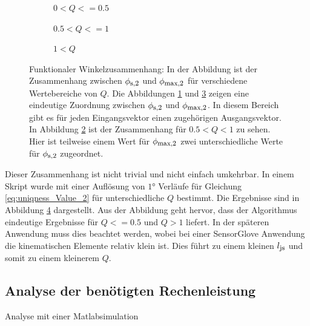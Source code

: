 	
\begin{figure}
	\begin{subfigure}{0.5\textwidth}
		\centering
		\caption{$0<Q<=0.5$}
		\label{fig:0_05_Unique}
	\end{subfigure}
	\hspace{0.25cm}
	\begin{subfigure}{0.5\textwidth}
		\centering
		\caption{$0.5<Q<=1$}
		\label{fig:05_10_unique}
	\end{subfigure}
	\begin{subfigure}{0.5\textwidth}
		\centering
		\caption{$1<Q$}
		\label{fig:bigger1_unique}
	\end{subfigure}
	\caption{ Funktionaler Winkelzusammenhang: In der Abbildung ist der Zusammenhang zwischen $\phi_{\textrm{\footnotesize{s,2}}}$ und $\phi_{\textrm{\footnotesize{max,2}}}$ für verschiedene Wertebereiche von $Q$. Die Abbildungen \ref{fig:0_05_Unique} und \ref{fig:bigger1_unique} zeigen eine eindeutige Zuordnung zwischen $\phi_{\textrm{\footnotesize{s,2}}}$ und $\phi_{\textrm{\footnotesize{max,2}}}$. In diesem Bereich gibt es für jeden Eingangsvektor einen zugehörigen Ausgangsvektor. In Abbildung \ref{fig:05_10_unique} ist der Zusammenhang für $0.5 < Q < 1$ zu sehen. Hier ist teilweise einem Wert für $\phi_{\textrm{\footnotesize{max,2}}}$ zwei unterschiedliche Werte für $\phi_{\textrm{\footnotesize{s,2}}}$ zugeordnet.}

    
	\label{fig:uniqueness}
\end{figure}

Dieser Zusammenhang ist nicht trivial und nicht einfach umkehrbar. In einem Skript wurde mit einer Auflösung von $1°$ Verläufe für Gleichung \ref{eq:uniqness_Value_2} für unterschiedliche $Q$ bestimmt. Die Ergebnisse sind in Abbildung \ref{fig:uniqueness} dargestellt. Aus der Abbildung geht hervor, dass der Algorithmus eindeutige Ergebnisse für $Q<=0.5$ und $Q>1$ liefert. In der späteren Anwendung muss dies beachtet werden, wobei bei einer SensorGlove Anwendung die kinematischen Elemente relativ klein ist. Dies führt zu einem kleinen $l_{\textrm{\footnotesize{js}}}$ und somit zu einem kleinerem $Q$. 

\subsection{Analyse der benötigten Rechenleistung}
Analyse mit einer Matlabsimulation

